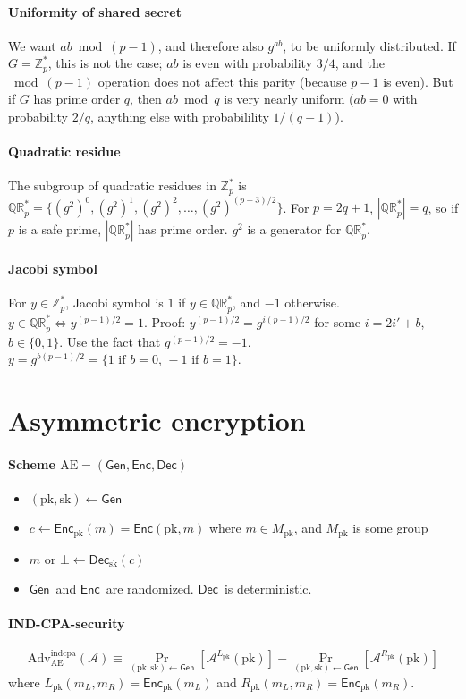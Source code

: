 \documentclass[11pt]{article}
\newcommand{\eqdef}{\ensuremath{\equiv}}
\newcommand{\Gen}{\ensuremath{\mathsf{Gen}}}
\newcommand{\Enc}{\ensuremath{\mathsf{Enc}}}
\newcommand{\Dec}{\ensuremath{\mathsf{Dec}}}
\newcommand{\abs}[1]{{\ensuremath{\left\vert#1\right\vert}}}
\newcommand{\ZZ}{\ensuremath{\mathds{Z}}}
\newcommand{\QR}{\ensuremath{\mathds{QR}}}
\newcommand{\pk}{\text{pk}}
\newcommand{\sk}{\text{sk}}
\renewcommand{\AE}{\text{AE}}
\newcommand{\Adv}{\text{Adv}}
\newcommand{\indcpa}{\text{indcpa}}
\theoremstyle{remark}
\begin{document}
\paragraph{Uniformity of shared secret}
We want $ab\bmod(p-1)$, and therefore also $g^{ab}$,
to be uniformly distributed.
If $G=\ZZ_p^*$, this is not the case;
$ab$ is even with probability $3/4$, and the $\bmod(p-1)$
operation does not affect this parity (because $p-1$ is even).
But if $G$ has prime order $q$, then $ab\bmod q$ is very nearly uniform
($ab=0$ with probability $2/q$, anything else with probabilility $1/(q-1)$).

\paragraph{Quadratic residue}
The subgroup of quadratic residues in $\ZZ_p^*$ is
$\QR_p^* = \{(g^2)^0, (g^2)^1, (g^2)^2, \ldots, (g^2)^{(p-3)/2}\}$.
For $p=2q+1$, $\abs{\QR_p^*}=q$, so if $p$ is a safe prime,
$\abs{\QR_p^*}$ has prime order.
$g^2$ is a generator for $\QR_p^*$.

\paragraph{Jacobi symbol} For $y\in\ZZ_p^*$, Jacobi symbol is
$1$ if $y\in\QR_p^*$, and $-1$ otherwise.
$y\in\QR_p^*\iff y^{(p-1)/2}=1$.
Proof:
$y^{(p-1)/2}=g^{i(p-1)/2}$ for some $i=2i'+b$, $b\in\{0,1\}$.
Use the fact that $g^{(p-1)/2}=-1$.
$y=g^{b(p-1)/2} = \{ 1 \text{ if } b=0\text{, } -1\text{ if } b=1 \}$.

\section{Asymmetric encryption}

\paragraph{Scheme $\AE=(\Gen,\Enc,\Dec)$}
\begin{itemize}
\item $(\pk,\sk)\gets\Gen$
\item $c\gets\Enc_\pk(m)=\Enc(\pk,m)$ where
      $m\in M_\pk$, and $M_\pk$ is some group
\item $m\text{ or }\bot\gets\Dec_\sk(c)$
\item \Gen\ and \Enc\ are randomized. \Dec\ is deterministic.
\end{itemize}

\paragraph{IND-CPA-security}
\[\Adv_\AE^\indcpa(\mathcal{A})\eqdef
\Pr_{(\pk,\sk)\gets\Gen}\left[\mathcal{A}^{L_\pk}(\pk)\right] -
\Pr_{(\pk,\sk)\gets\Gen}\left[\mathcal{A}^{R_\pk}(\pk)\right]
\] where $L_\pk(m_L,m_R)=\Enc_\pk(m_L)$
and $R_\pk(m_L,m_R)=\Enc_\pk(m_R)$.
\end{document}
